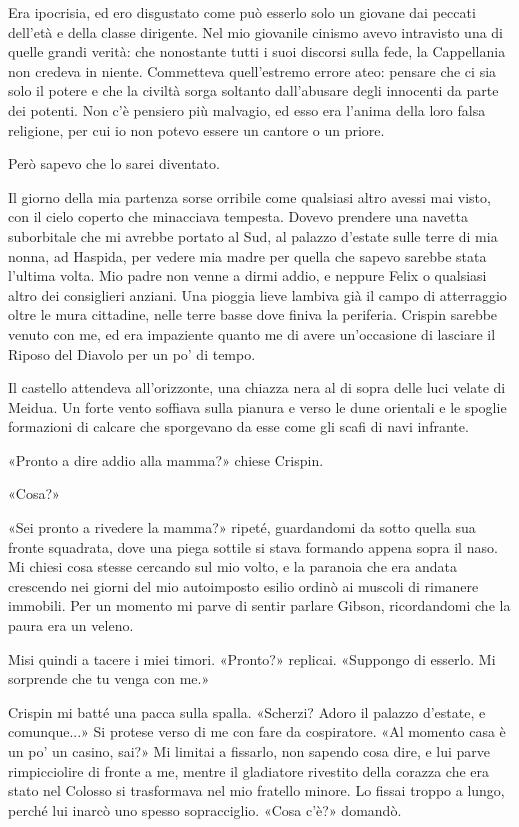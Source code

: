 Era ipocrisia, ed ero disgustato come può esserlo solo un giovane dai
peccati dell'età e della classe dirigente. Nel mio giovanile cinismo
avevo intravisto una di quelle grandi verità: che nonostante tutti i
suoi discorsi sulla fede, la Cappellania non credeva in niente.
Commetteva quell'estremo errore ateo: pensare che ci sia solo il potere
e che la civiltà sorga soltanto dall'abusare degli innocenti da parte
dei potenti. Non c'è pensiero più malvagio, ed esso era l'anima della
loro falsa religione, per cui io non potevo essere un cantore o un
priore.

Però sapevo che lo sarei diventato.

Il giorno della mia partenza sorse orribile come qualsiasi altro avessi
mai visto, con il cielo coperto che minacciava tempesta. Dovevo prendere
una navetta suborbitale che mi avrebbe portato al Sud, al palazzo
d'estate sulle terre di mia nonna, ad Haspida, per vedere mia madre per
quella che sapevo sarebbe stata l'ultima volta. Mio padre non venne a
dirmi addio, e neppure Felix o qualsiasi altro dei consiglieri anziani.
Una pioggia lieve lambiva già il campo di atterraggio oltre le mura
cittadine, nelle terre basse dove finiva la periferia. Crispin sarebbe
venuto con me, ed era impaziente quanto me di avere un'occasione di
lasciare il Riposo del Diavolo per un po' di tempo.

Il castello attendeva all'orizzonte, una chiazza nera al di sopra delle
luci velate di Meidua. Un forte vento soffiava sulla pianura e verso le
dune orientali e le spoglie formazioni di calcare che sporgevano da esse
come gli scafi di navi infrante.

«Pronto a dire addio alla mamma?» chiese Crispin.

«Cosa?»

«Sei pronto a rivedere la mamma?» ripeté, guardandomi da sotto quella
sua fronte squadrata, dove una piega sottile si stava formando appena
sopra il naso. Mi chiesi cosa stesse cercando sul mio volto, e la
paranoia che era andata crescendo nei giorni del mio autoimposto esilio
ordinò ai muscoli di rimanere immobili. Per un momento mi parve di
sentir parlare Gibson, ricordandomi che la paura era un veleno.

Misi quindi a tacere i miei timori. «Pronto?» replicai. «Suppongo di
esserlo. Mi sorprende che tu venga con me.»

Crispin mi batté una pacca sulla spalla. «Scherzi? Adoro il palazzo
d'estate, e comunque...» Si protese verso di me con fare da cospiratore.
«Al momento casa è un po' un casino, sai?» Mi limitai a fissarlo, non
sapendo cosa dire, e lui parve rimpicciolire di fronte a me, mentre il
gladiatore rivestito della corazza che era stato nel Colosso si
trasformava nel mio fratello minore. Lo fissai troppo a lungo, perché
lui inarcò uno spesso sopracciglio. «Cosa c'è?» domandò.


